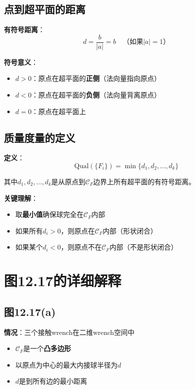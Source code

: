 \documentclass[12pt,a4paper]{article}
\begin{document}
\subsection{点到超平面的距离}

\textbf{有符号距离}：
\begin{equation}
d = \frac{b}{|a|} = b \quad \text{（如果$|a| = 1$）}
\end{equation}

\textbf{符号意义}：
\begin{itemize}
\item $d > 0$：原点在超平面的\textbf{正侧}（法向量指向原点）
\item $d < 0$：原点在超平面的\textbf{负侧}（法向量背离原点）
\item $d = 0$：原点在超平面上
\end{itemize}

\subsection{质量度量的定义}

\textbf{定义}：
\begin{equation}
\text{Qual}(\{F_i\}) = \min\{d_1, d_2, \ldots, d_k\}
\label{eq:quality_metric}
\end{equation}

其中$d_1, d_2, \ldots, d_k$是从原点到$\mathcal{C}_F$边界上所有超平面的有符号距离。

\textbf{关键理解}：
\begin{itemize}
\item 取\textbf{最小值}确保球完全在$\mathcal{C}_F$内部
\item 如果所有$d_i > 0$，则原点在$\mathcal{C}_F$内部（形状闭合）
\item 如果某个$d_i < 0$，则原点不在$\mathcal{C}_F$内部（不是形状闭合）
\end{itemize}

\section{图12.17的详细解释}

\subsection{图12.17(a)}

\textbf{情况}：三个接触wrench在二维wrench空间中

\begin{itemize}
\item $\mathcal{C}_F$是一个\textbf{凸多边形}
\item 以原点为中心的最大内接球半径为$d$
\item $d$是到所有边的最小距离
\end{itemize}
\end{document}
